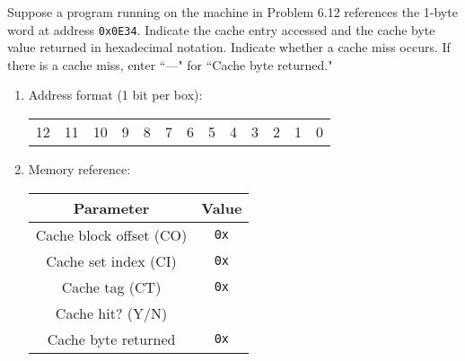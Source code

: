 \documentclass[12pt]{article}
\newenvironment{ex}[2][Exercise]{\begin{trivlist}
		\item[\hskip \labelsep {\bfseries #1}\hskip \labelsep {\bfseries #2.}]}{\end{trivlist}}
\begin{document}
\begin{ex}{6.13}
	Suppose a program running on the machine in Problem 6.12 references the 1-byte word at
	address \texttt{0x0E34}. Indicate the cache entry accessed and the cache byte value
	returned in hexadecimal notation. Indicate whether a cache miss occurs. If there is a
	cache miss, enter ``---" for ``Cache byte returned."
	\begin{enumerate}[label=(\alph*)]
		\item Address format (1 bit per box):
		\begin{center}
			\begin{tabular}{|c|c|c|c|c|c|c|c|c|c|c|c|c|}
				\hline
				{} & {} & {} & {} & {} & {} & {} & {} & {} & {} & {} & {} & {}\\
				\hline
				12 & 11 & 10 & 9 & 8 & 7 & 6 & 5 & 4 & 3 & 2 & 1 & 0
			\end{tabular}
		\end{center}
		\item Memory reference:
		\begin{center}
			\begin{tabular}{cc}
				Parameter & Value\\
				\hline
				Cache block offset (CO) & \texttt{0x}\makebox[1cm]{\hrulefill}\\
				Cache set index (CI) & \texttt{0x}\makebox[1cm]{\hrulefill}\\
				Cache tag (CT) & \texttt{0x}\makebox[1cm]{\hrulefill}\\
				Cache hit? (Y/N) & \makebox[1cm]{\hrulefill}\\
				Cache byte returned & \texttt{0x}\makebox[1cm]{\hrulefill}
			\end{tabular}
		\end{center}
	\end{enumerate}
\end{ex}
\end{document}
